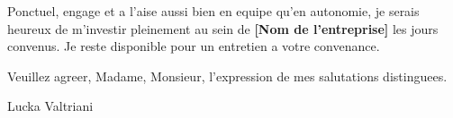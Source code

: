 \documentclass[11pt,a4paper]{article}
\newcommand{\entreprise}{[Nom de l'entreprise]}
\begin{document}
Ponctuel, engage et a l'aise aussi bien en equipe qu'en autonomie, je serais heureux de m'investir pleinement au sein de \textbf{\entreprise} les jours convenus. Je reste disponible pour un entretien a votre convenance.

\vspace{18pt}

Veuillez agreer, Madame, Monsieur, l'expression de mes salutations distinguees.

\vspace{28pt}

\noindent Lucka Valtriani
\end{document}
